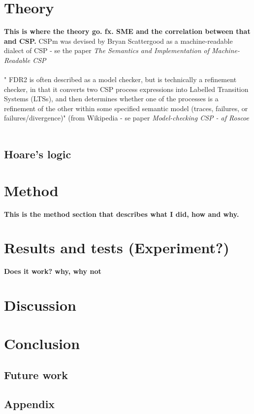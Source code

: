 \documentclass[a4paper]{report}
\begin{document}
\chapter{Theory}
\textbf{This is where the theory go. fx. SME and the correlation between that and CSP.}
CSPm was devised by Bryan Scattergood as a machine-readable dialect of CSP  - se the paper \textit{The Semantics and Implementation of Machine-Readable CSP}\\\\
" FDR2 is often described as a model checker, but is technically a refinement checker, in that it converts two CSP process expressions into Labelled Transition Systems (LTSs), and then determines whether one of the processes is a refinement of the other within some specified semantic model (traces, failures, or failures/divergence)" (from Wikipedia - se paper \textit{Model-checking CSP - af Roscoe} \\\\
\section{Hoare's logic}
\chapter{Method}
\textbf{This is the method section that describes what I did, how and why.}
\chapter{Results and tests (Experiment?)}
\textbf{Does it work? why, why not}
\chapter{Discussion}

\chapter{Conclusion}
\section{Future work}

\newpage



\section{Appendix}
\end{document}

